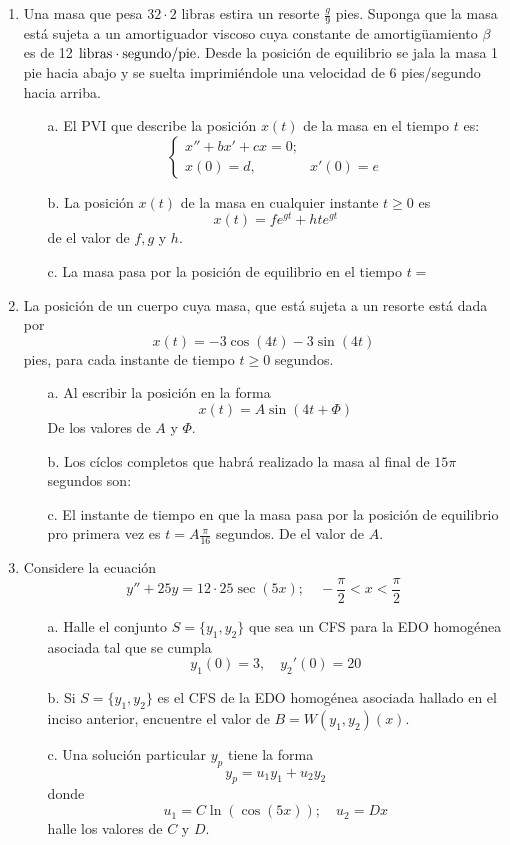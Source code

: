 \begin{enumerate}
\item Una masa que pesa $32 \cdot 2$ libras estira un resorte $\frac{g}{9}$ pies. Suponga que la masa está sujeta a un amortiguador viscoso cuya constante de amortigüamiento $\beta$ es de 12 ${\rm libras}\cdot {\rm segundo}/{\rm pie}$. Desde la posición de equilibrio se jala la masa 1 pie hacia abajo y se suelta imprimiéndole una velocidad de 6 pies/segundo hacia arriba. 
\begin{itemize}
    \item[a.] El PVI que describe la posición $x(t)$ de la masa en el tiempo $t$ es:
    $$\begin{cases}
        x'' +bx' + cx = 0; \\
        x(0) = d, & x'(0)= e
    \end{cases}$$
    \item[b.] La posición $x(t)$ de la masa en cualquier instante $t\geq 0$ es 
    $$x(t) = fe^{gt} +hte^{gt}$$
    de el valor de $f,g$ y $h$.
    \item[c.] La masa pasa por la posición de equilibrio en el tiempo $t = $
\end{itemize}

\item La posición de un cuerpo cuya masa, que está sujeta a un resorte está dada por
$$x(t) = -3\cos(4t)-3\sin(4t)$$
pies, para cada instante de tiempo $t\geq 0$ segundos.
\begin{itemize}
    \item[a.] Al escribir la posición en la forma
    $$x(t) = A\sin(4t+ \Phi)$$
    De los valores de $A$ y $\Phi$.
    \item[b.] Los cíclos completos que habrá realizado la masa al final de $15 \pi$ segundos son:
    \item[c.] El instante de tiempo en que la masa pasa por la posición de equilibrio pro primera vez es $t = A\frac{\pi}{16}$ segundos. De el valor de $A$.
\end{itemize}

\item Considere la ecuación 
$$y'' +25y = 12 \cdot 25 \sec(5x); \quad -\frac{\pi}{2}< x<\frac{\pi}{2}$$
\begin{itemize}
    \item[a.] Halle el conjunto $S = \{y_1,y_2\}$ que sea un CFS para la EDO homogénea asociada tal que  se cumpla
    $$y_1(0) = 3, \quad y_2'(0) = 20$$
    \item[b.] Si $S= \{y_1,y_2\}$ es el CFS de la EDO homogénea asociada hallado en el inciso anterior, encuentre el valor de $B = W(y_1,y_2)(x)$.
    \item[c.] Una solución particular $y_p$ tiene la forma
    $$y_p = u_1y_1 + u_2y_2$$
    donde $$u_1 = C\ln(\cos(5x)); \quad u_2 = Dx$$ halle los valores de $C$ y $D$.
\end{itemize}
\end{enumerate}

